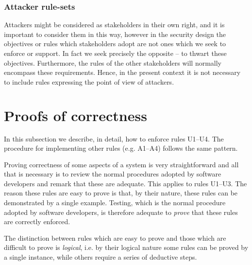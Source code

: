 \subsubsection{Attacker rule-sets}
\fi
Attackers might be considered as stakeholders in their own right, and it is
important to consider them in this way, however in the security design
the objectives or rules which stakeholders adopt are not ones which we seek
to enforce or support. In fact we seek precisely the opposite -- to thwart
these objectives. Furthermore, the rules of the other stakeholders will normally
encompass these requirements. Hence, in the present context it is not necessary
to include rules expressing the point of view of attackers.

\section{Proofs of correctness}\label{proof}

In this subsection we describe, in detail, how to enforce rules U1--U4.
The procedure for implementing other rules (e.g. A1--A4) follows the same pattern.

Proving correctness of some aspects of a system is very straightforward
and all that is necessary is to review the normal procedures adopted
by software developers and remark that these are adequate. This applies
to rules U1--U3. The reason these rules are easy to prove
is that, by their nature, these rules can be demonstrated by a single
example. Testing, which is the normal procedure adopted by software developers,
is therefore adequate to {\em prove} that these rules are correctly enforced.

The distinction between rules which are easy to prove and those which are difficult
to prove is {\em logical}, i.e. by their logical nature 
some rules can be proved by a single instance, while others require a series of 
deductive steps. 

